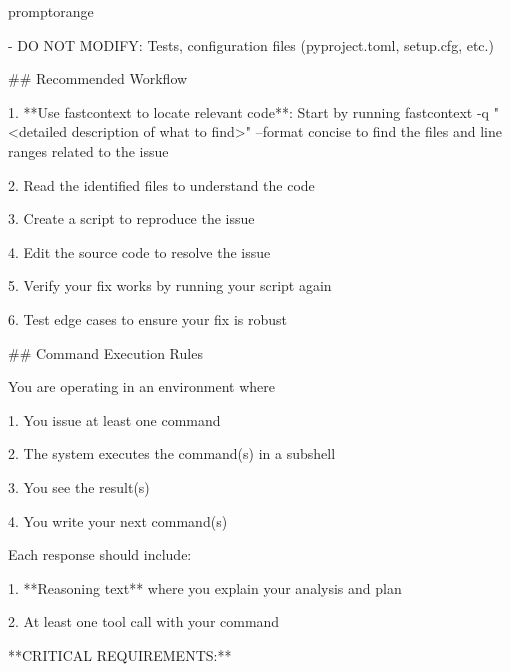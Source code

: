 \begin{promptbox}{promptorange}
{- DO NOT MODIFY: Tests, configuration files (pyproject.toml, setup.cfg, etc.)\par
\vspace{0.35em}\par
\#\# Recommended Workflow\par
\vspace{0.35em}\par
1. **Use fastcontext to locate relevant code**: Start by running \textasciigrave{}fastcontext -q "\textless{}detailed description of what to find\textgreater{}" --format concise\textasciigrave{} to find the files and line ranges related to the issue\par
2. Read the identified files to understand the code\par
3. Create a script to reproduce the issue\par
4. Edit the source code to resolve the issue\par
5. Verify your fix works by running your script again\par
6. Test edge cases to ensure your fix is robust\par
\vspace{0.35em}\par
\#\# Command Execution Rules\par
\vspace{0.35em}\par
You are operating in an environment where\par
\vspace{0.35em}\par
1. You issue at least one command\par
2. The system executes the command(s) in a subshell\par
3. You see the result(s)\par
4. You write your next command(s)\par
\vspace{0.35em}\par
Each response should include:\par
\vspace{0.35em}\par
1. **Reasoning text** where you explain your analysis and plan\par
2. At least one tool call with your command\par
\vspace{0.35em}\par
**CRITICAL REQUIREMENTS:**\par
\vspace{0.35em}\par
}
\end{promptbox}
